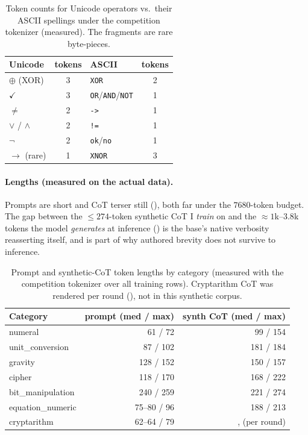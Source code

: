 \documentclass[11pt]{article}
\begin{document}
\begin{table}[htbp]
\centering
\caption{Token counts for Unicode operators vs.\ their ASCII spellings under the competition
tokenizer (measured). The fragments are rare byte-pieces.}
\label{tab:tok}
\small
\begin{tabular}{l c | l c}
\toprule
Unicode & tokens & ASCII & tokens \\
\midrule
$\oplus$ (XOR) & 3 & \texttt{XOR} & 2 \\
$\checkmark$   & 3 & \texttt{OR}/\texttt{AND}/\texttt{NOT} & 1 \\
$\neq$         & 2 & \verb|->| & 1 \\
$\vee$ / $\wedge$ & 2 & \verb|!=| & 1 \\
$\neg$         & 2 & \texttt{ok}/\texttt{no} & 1 \\
$\to$ (rare)   & 1 & \texttt{XNOR} & 3 \\
\bottomrule
\end{tabular}
\end{table}

\paragraph{Lengths (measured on the actual data).} Prompts are short and CoT terser still
(), both far under the $7680$-token budget. The gap between the
$\leq\!274$-token synthetic CoT I \emph{train} on and the $\approx\!1$k--$3.8$k tokens the
model \emph{generates} at inference () is the base's native verbosity
reasserting itself, and is part of why authored brevity does not survive to inference.

\begin{table}[htbp]
\centering
\caption{Prompt and synthetic-CoT token lengths by category (measured with the competition
tokenizer over all training rows). Cryptarithm CoT was rendered per round (),
not in this synthetic corpus.}
\label{tab:toklen}
\small
\begin{tabular}{l r r}
\toprule
Category & prompt (med / max) & synth CoT (med / max) \\
\midrule
numeral          & 61 / 72   & 99 / 154 \\
unit\_conversion & 87 / 102  & 181 / 184 \\
gravity          & 128 / 152 & 150 / 157 \\
cipher           & 118 / 170 & 168 / 222 \\
bit\_manipulation& 240 / 259 & 221 / 274 \\
equation\_numeric& 75--80 / 96 & 188 / 213 \\
cryptarithm      & 62--64 / 79 &, (per round) \\
\bottomrule
\end{tabular}
\end{table}
\end{document}
